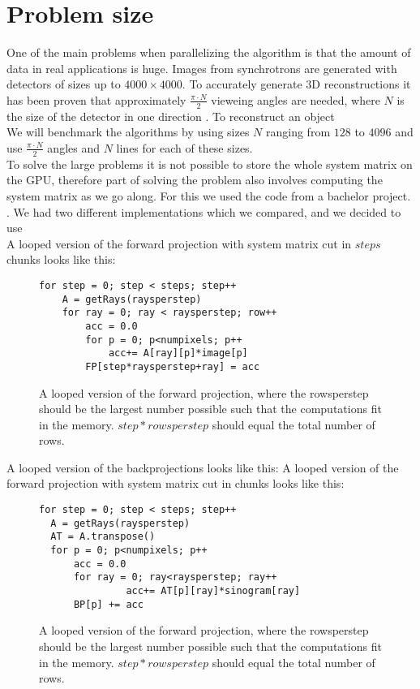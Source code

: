 \section{Problem size}
One of the main problems when parallelizing the algorithm is that the amount of data in real applications is huge. Images from synchrotrons are generated with detectors of sizes up to $4000\times4000$. To accurately generate 3D reconstructions it has been proven that approximately $\frac{\pi\cdot N}{2}$ vieweing angles are needed, where $N$ is the size of the detector in one direction . To reconstruct an object \\
We will benchmark the algorithms by using sizes $N$ ranging from $128$ to $4096$ and use $\frac{\pi\cdot N}{2}$  angles and $N$ lines for each of these sizes.\\
To solve the large problems it is not possible to store the whole system matrix on the GPU, therefore part of solving the problem also involves computing the system matrix as we go along. For this we used the code from a bachelor project. . We had two different implementations which we compared, and we decided to use \\
A looped version of the forward projection with system matrix cut in $steps$ chunks looks like this:
\begin{figure}[h]
\begin{lstlisting}[frame=single]
for step = 0; step < steps; step++
	A = getRays(raysperstep)
	for ray = 0; ray < raysperstep; row++
		acc = 0.0
		for p = 0; p<numpixels; p++
			acc+= A[ray][p]*image[p]
		FP[step*raysperstep+ray] = acc
\end{lstlisting}
  \caption{A looped version of the forward projection, where the rowsperstep should be the largest number possible such that the computations fit in the memory. $step*rowsperstep$ should equal the total number of rows.}
\end{figure}

A looped version of the backprojections looks like this:
A looped version of the forward projection with system matrix cut in chunks looks like this:
\begin{figure}[h]
\begin{lstlisting}[frame=single]
for step = 0; step < steps; step++
  A = getRays(raysperstep)
  AT = A.transpose()
  for p = 0; p<numpixels; p++
      acc = 0.0
      for ray = 0; ray<raysperstep; ray++
			   acc+= AT[p][ray]*sinogram[ray]
      BP[p] += acc
\end{lstlisting}
  \caption{A looped version of the forward projection, where the rowsperstep should be the largest number possible such that the computations fit in the memory. $step*rowsperstep$ should equal the total number of rows.}
\end{figure}


